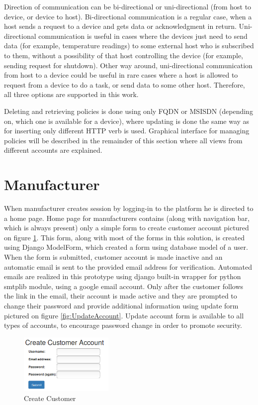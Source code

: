 Direction of communication can be bi-directional or uni-directional (from host to device, or device to host). Bi-directional communication is a regular case, when a host sends a request to a device and gets data or acknowledgment in return. Uni-directional communication is useful in cases where the devices just need to send data (for example, temperature readings) to some external host who is subscribed to them, without a possibility of that host controlling the device (for example, sending request for shutdown). Other way around, uni-directional communication from host to a device could be useful in rare cases where a host is allowed to request from a device to do a task, or send data to some other host. Therefore, all three options are supported in this work.

Deleting and retrieving policies is done using only FQDN or MSISDN (depending on, which one is available for a device), where updating is done the same way as for inserting only different HTTP verb is used. Graphical interface for managing policies will be described in the remainder of this section where all views from different accounts are explained.

\section{Manufacturer}
\label{Manufacturer}

When manufacturer creates session by logging-in to the platform he is directed to a home page. Home page for manufacturers contains (along with navigation bar, which is always present) only a simple form to create customer account pictured on figure \ref{fig:CreateCustomer}. This form, along with most of the forms in this solution, is created using Django ModelForm, which created a form using database model of a user. When the form is submitted, customer account is made inactive and an automatic email is sent to the provided email address for verification. Automated emails are realized in this prototype using django built-in wrapper for python smtplib module, using a google email account. Only after the customer follows the link in the email, their account is made active and they are prompted to change their password and provide additional information using update form pictured on figure \ref{fig:UpdateAccount}. Update account form is available to all types of accounts, to encourage password change in order to promote security.

\begin{figure}
	\begin{center}
		\includegraphics[width=0.4\textwidth]{images/implementation/CreateCustomer}
		\caption{Create Customer}
		\label{fig:CreateCustomer}
	\end{center}
\end{figure}

